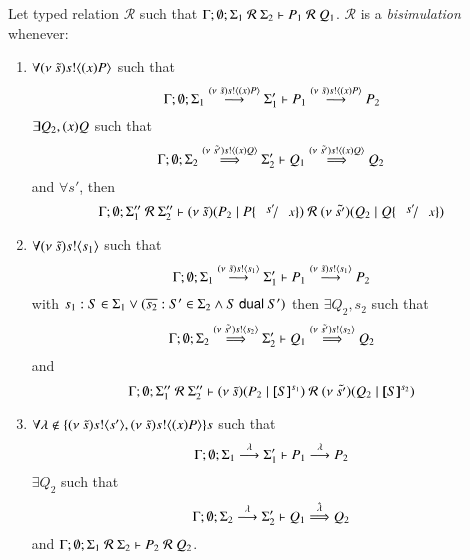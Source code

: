 \begin{definition}[Bisimulation]\rm
	Let typed relation $\mathcal{R}$ such that $\Gamma; \emptyset; \Sigma_1\ \mathcal{R}\ \Sigma_2 \proves P_1\ \mathcal{R}\ Q_1$.
	$\mathcal{R}$ is a {\em bisimulation} whenever:
	\begin{enumerate}
		\item	$\forall (\nu\ \tilde{s}) s ! \langle (x)P \rangle$ such that
			\[
				\Gamma; \emptyset; \Sigma_1 \stackrel{(\nu\ \tilde{s}) s ! \langle (x)P \rangle}{\longrightarrow} \Sigma_1' \vdash P_1 \stackrel{(\nu\ \tilde{s}) s ! \langle (x)P \rangle}{\longrightarrow} P_2
			\]
			$\exists Q_2, (x)Q$ such that
			\[
				\Gamma; \emptyset; \Sigma_2 \stackrel{(\nu\ \tilde{s'}) s ! \langle (x)Q \rangle}{\Longrightarrow} \Sigma_2' \vdash Q_1 \stackrel{(\nu\ \tilde{s'}) s ! \langle (x)Q \rangle}{\Longrightarrow} Q_2
			\]
			and $\forall s'$, %
			then
			\[
				\Gamma; \emptyset; \Sigma_1''\ \mathcal{R}\ \Sigma_2'' \proves \newsp{\tilde{s}}{P_2 \Par P \subst{s'}{x}}\ \mathcal{R}\ 
				\newsp{\tilde{s'}}{Q_2 \Par Q \subst{s'}{x}}
			\]
		\item	$\forall (\nu\ \tilde{s}) s ! \langle s_1 \rangle$ such that
			\[
				\Gamma; \emptyset; \Sigma_1 \stackrel{(\nu\ \tilde{s}) s ! \langle s_1 \rangle}{\longrightarrow} \Sigma_1' \vdash P_1 \stackrel{(\nu\ \tilde{s}) s ! \langle s_1 \rangle}{\longrightarrow} P_2
			\]
			with $s_1: S \in \Sigma_1 \vee (\overline{s_2}: S' \in \Sigma_2 \wedge S \ \mathsf{dual}\  S')$
			then $\exists Q_2, s_2$ such that
			\[
				\Gamma; \emptyset; \Sigma_2 \stackrel{(\nu\ \tilde{s'}) s ! \langle s_2 \rangle}{\Longrightarrow} \Sigma_2' \vdash Q_1 \stackrel{(\nu\ \tilde{s'}) s ! \langle s_2 \rangle}{\Longrightarrow} Q_2
			\]
			and
			\[
				\Gamma; \emptyset; \Sigma_1''\ \mathcal{R}\ \Sigma_2'' \proves \newsp{\tilde{s}}{P_2 \Par \map{S}^{s_1}}\ \mathcal{R}\ 
				\newsp{\tilde{s'}}{Q_2 \Par \map{S}^{s_2}}
			\]

		\item	$\forall \lambda \notin \{(\nu\ \tilde{s}) s ! \langle s' \rangle, (\nu\ \tilde{s}) s ! \langle (x)P \rangle\}s$ such that
			\[
				\Gamma; \emptyset; \Sigma_1 \stackrel{\lambda}{\longrightarrow} \Sigma_1' \vdash P_1 \stackrel{\lambda}{\longrightarrow} P_2
			\]
			$\exists Q_2$ such that 
			\[
				\Gamma; \emptyset; \Sigma_2 \stackrel{\lambda}{\longrightarrow} \Sigma_2' \vdash Q_1 \stackrel{\hat{\lambda}}{\Longrightarrow} Q_2
			\]
			and
			$\Gamma; \emptyset; \Sigma_1\ \mathcal{R}\ \Sigma_2 \proves P_2\ \mathcal{R}\ Q_2$.


\end{enumerate}
\end{definition}
